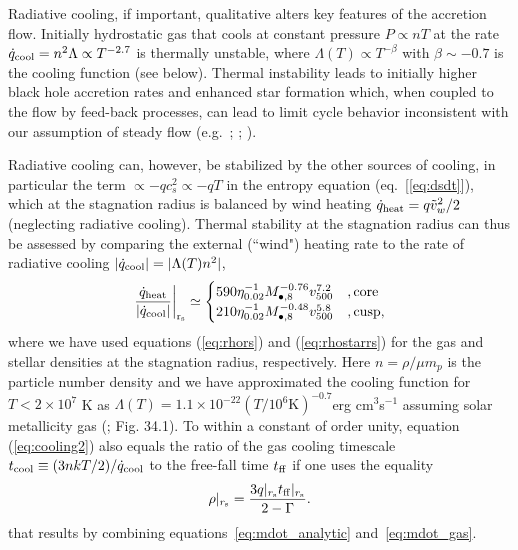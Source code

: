 \documentclass[usenatbib,fleqn]{mn2e}
\newcommand{\tff}{t_{\rm ff}}
\begin{document}
Radiative cooling, if important, qualitative alters key features of the accretion flow.  Initially hydrostatic gas that cools at constant pressure $P \propto nT$ at the rate $\dot{q}_{\rm cool} = n^{2}\Lambda \propto T^{-2.7}$ is thermally unstable, where $\Lambda(T) \propto T^{-\beta}$ with $\beta \sim -0.7$ is the cooling function (see below).  Thermal instability leads to initially higher black hole accretion rates and enhanced star formation which, when coupled to the flow by feed-back processes, can lead to limit cycle behavior inconsistent with our assumption of steady flow (e.g.~\citealt{Ciotti&Ostriker07}; \citealt{Ciotti+10}; \citealt{Gan+14}).  

Radiative cooling can, however, be stabilized by the other sources of cooling, in particular the term $\propto -q c_{s}^{2} \propto -qT$ in the entropy equation (eq.~[\ref{eq:dsdt}]), which at the stagnation radius is balanced by wind heating $\dot{q}_{\rm heat} = q \tilde{v}_{w}^{2}/2$ (neglecting radiative cooling).  Thermal stability at the stagnation radius can thus be assessed by comparing the external (``wind") heating rate to the rate of radiative cooling $|\dot{q}_{\rm cool}| =|\Lambda(T) n^2|$,
\begin{align}
\left.\frac{\dot{q}_{\rm heat}}{|\dot{q}_{\rm cool}|}\right|_{\rm r_{\rm s}} \simeq
  \begin{cases}
   590 \eta_{0.02}^{-1} M_{\bullet,8}^{-0.76}v_{500}^{7.2}  &, \text{core}\\
   210 \eta_{0.02}^{-1} M_{\bullet,8}^{-0.48}v_{500}^{5.8}  &, \text{cusp},     
  \end{cases}
  \label{eq:cooling2}
\end{align}
where we have used equations (\ref{eq:rhors}) and (\ref{eq:rhostarrs}) for the gas and stellar densities at the stagnation radius, respectively.  Here $n = \rho/\mu m_p$ is the particle number density and we have approximated the cooling function for $T < 2\times 10^{7}$ K as $\Lambda(T) = 1.1 \times 10^{-22} \left(T/10^6 \text{K}\right)^{-0.7}  $erg cm$^3 $s$^{-1}$ assuming solar metallicity gas (\citealt{Draine:2011a}; Fig. 34.1).  To within a constant of order unity, equation (\ref{eq:cooling2}) also equals the ratio of the gas cooling timescale $t_{\rm cool} \equiv (3n kT/2)/\dot{q}_{\rm cool}$ to the free-fall time $t_{\rm ff}$ if one uses the equality 
\begin{align}
\rho|_{r_{\rm s}}=\frac{3 q|_{r_{\rm s}} \tff|_{r_{\rm s}}}{2-\Gamma}.
\label{eq:rhors2}
\end{align}
that results by combining equations~\eqref{eq:mdot_analytic} and~\eqref{eq:mdot_gas}.
\end{document}
